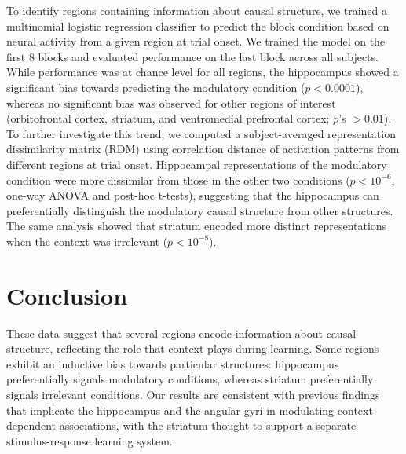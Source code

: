 \documentclass[10pt,letterpaper]{article}
\begin{document}
To identify regions containing information about causal structure, we trained a multinomial logistic regression classifier to predict the block condition based on neural activity from a given region at trial onset. We trained the model on the first 8 blocks and evaluated performance on the last block across all subjects. While performance was at chance level for all regions, the hippocampus showed a significant bias towards predicting the modulatory condition ($p < 0.0001$), whereas no significant bias was observed for other regions of interest (orbitofrontal cortex, striatum, and ventromedial prefrontal cortex; $p$'s $> 0.01$). To further investigate this trend, we computed a subject-averaged representation dissimilarity matrix (RDM) using correlation distance of activation patterns from different regions at trial onset. Hippocampal representations of the modulatory condition were more dissimilar from those in the other two conditions ($p < 10^{-6}$, one-way ANOVA and post-hoc t-tests), suggesting that the hippocampus can preferentially distinguish the modulatory causal structure from other structures. The same analysis showed that striatum encoded more distinct representations when the context was irrelevant ($p < 10^{-8}$).


\section{Conclusion}


These data suggest that several regions encode information about causal structure, reflecting the role that context plays during learning. Some regions exhibit an inductive bias towards particular structures: hippocampus preferentially signals modulatory conditions, whereas striatum preferentially signals irrelevant conditions. Our results are consistent with previous findings that implicate the hippocampus and the angular gyri in modulating context-dependent associations, with the striatum thought to support a separate stimulus-response learning system.





\setlength{\bibleftmargin}{.125in}
\setlength{\bibindent}{-\bibleftmargin}


\end{document}

